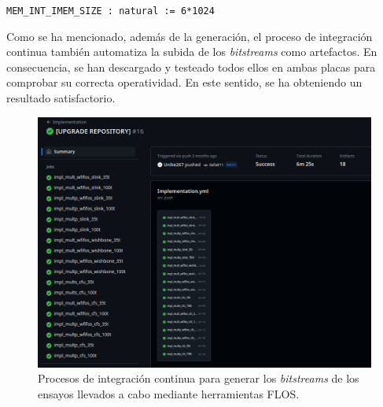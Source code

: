 \hspace{30mm} \texttt{MEM_INT_IMEM_SIZE : natural := 6*1024}

\noindent Como se ha mencionado, además de la generación, el proceso de integración continua también automatiza la subida de los \textit{bitstreams} como artefactos.
En consecuencia, se han descargado y testeado todos ellos en ambas placas para comprobar su correcta operatividad.
En este sentido, se ha obteniendo un resultado satisfactorio.

\begin{figure}[H]
    \centering
    \includegraphics[width=14cm]{Figuras/impl-gh.png}
    \caption{Procesos de integración continua para generar los \textit{bitstreams} de los ensayos llevados a cabo mediante herramientas FLOS.}
    \label{fig:impl-gh}
\end{figure}

